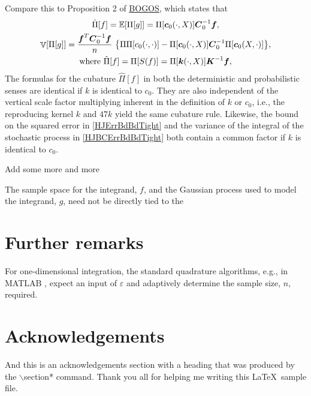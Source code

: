 \documentclass[sts]{imsart}
\numberwithin{equation}{section}
\theoremstyle{plain}
\newcommand{\vC}{\boldsymbol{C}}
\DeclareMathOperator{\Var}{\mathbb{V}}
\newcommand{\BOGOS}{\hyperlink{BriEtal18a}{BOGOS}\xspace}
\begin{document}
Compare this to Proposition 2 of \BOGOS, which states that 
\begin{subequations} \label{HJBCErrBdTight}
\begin{gather} 
\label{HJBCErrbdTightCub}
    \hat{\Pi}[f] = \Ex[\Pi[g]] = \Pi[\vc_0(\cdot, X)] \vC_0^{-1} \vf , \\
    \label{HJBCErrBdBdTight}
    \Var[\Pi[g]] = \frac{\vf^T \vC_0^{-1} \vf}{n} \ \bigl \{ \Pi\Pi[c_0(\cdot,\cdot)] - \Pi[\vc_0(\cdot, X)]\vC_0^{-1} \Pi[\vc_0(X,\cdot)] \bigr \} , \\
    \text{where } \hat{\Pi}[f] = \Pi[S(f)] = \Pi[\vk(\cdot, X)] \vK^{-1} \vf,
\end{gather}
\end{subequations}
The formulas for the cubature $\hat{\Pi}[f]$ in both the deterministic and probabilistic senses are identical if $k$ is identical to $c_0$.  They are also independent of the vertical scale factor multiplying inherent in the definition of $k$ or $c_0$, i.e., the reproducing kernel $k$ and $47k$ yield the same cubature rule.  Likewise, the bound on the squared error in \eqref{HJErrBdBdTight} and the variance of the integral of the stochastic process in \eqref{HJBCErrBdBdTight} both contain a common factor if $k$ is identical to $c_0$.


Add some more and more


The sample space for the integrand, $f$, and the Gaussian process used to model the integrand, $g$, need not be directly tied to the 


\section{Further remarks}


For one-dimensional integration, the standard quadrature algorithms, e.g., in MATLAB \citep{MAT9.5}, expect an input of $\varepsilon$ and adaptively determine the sample size, $n$, required.




\section*{Acknowledgements}
And this is an acknowledgements section with a heading that was produced by the
$\backslash$section* command. Thank you all for helping me writing this
\LaTeX\ sample file.



\end{document}
